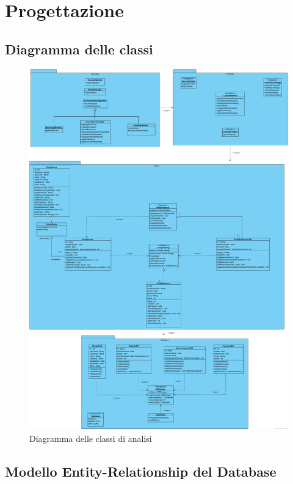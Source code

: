 \chapter{Progettazione}

\section{Diagramma delle classi}

\begin{figure}[h]
    \centering
	\includegraphics[width=\linewidth]{assets/ClassDiagramProgettazione.png}
    \caption{Diagramma delle classi di analisi}
\end{figure}

\pagebreak

\section{Modello Entity-Relationship del Database}

